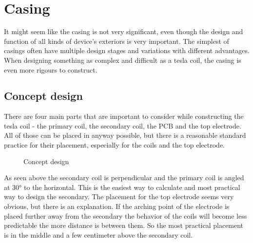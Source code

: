 \chapter{Casing}


It might seem like the casing is not very significant, even though the design and function of all kinds of device's exteriors is very important. The simplest of casings often have multiple design stages and variations with different advantages. When designing something as complex and difficult as a tesla coil, the casing is even more rigours to construct. 


\section{Concept design}

There are four main parts that are important to consider while constructing the tesla coil - the primary coil, the secondary coil, the PCB and the top electrode. All of those can be placed in anyway possible, but there is a reasonable standard practice for their placement, especially for the coils and the top electrode. 

\begin{figure}
    \centering
    \caption{Concept design}
    \label{BD-envision}
\end{figure}

As seen above the secondary coil is perpendicular and the primary coil is angled at 30° to the horizontal. This is the easiest way to calculate and most practical way to design the secondary. The placement for the top electrode seems very obvious, but there is an explanation. If the arching point of the electrode is placed further away from the secondary the behavior of the coils will become less predictable the more distance is between them. So the most practical placement is in the middle and a few centimeter above the secondary coil. 

